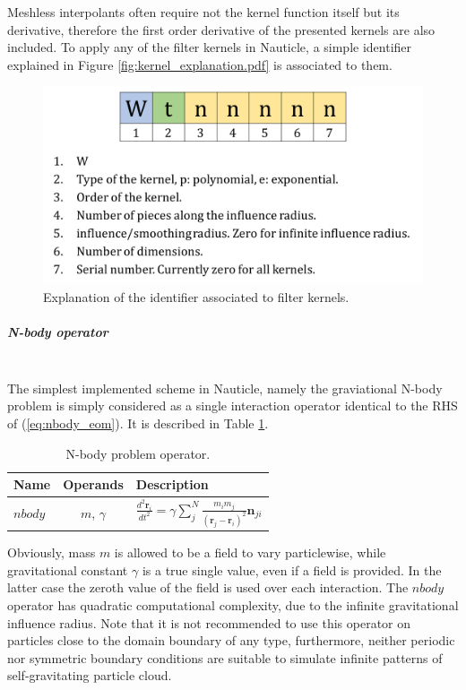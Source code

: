 \documentclass[a4paper,12pt,openany]{book}
\newcommand{\equref}[1]{(\ref{#1})}
\newcommand{\mysubparagraph}[1]{\subparagraph{#1}\mbox{}\\}
\theoremstyle{break}
\begin{document}
Meshless interpolants often require not the kernel function itself but its derivative, therefore the first order derivative of the presented kernels are also included. To apply any of the filter kernels in Nauticle, a simple identifier explained in Figure \ref{fig:kernel_explanation.pdf} is associated to them.
\begin{figure}[H]
  \includegraphics[scale=0.3]{kernel_explanation.pdf}
  \centering
  \caption{Explanation of the identifier associated to filter kernels.}
  \label{fig:kernel_explanation}
\end{figure}

\mysubparagraph{N-body operator}
The simplest implemented scheme in Nauticle, namely the graviational N-body problem is simply considered as a single interaction operator identical to the RHS of \equref{eq:nbody_eom}. It is described in Table \ref{tbl:nbody_op}.
\begin{table} [hbt!]
\begin{center}
\caption{N-body problem operator.}\label{tbl:nbody_op}
\begin{tabular}{ l c l }
\toprule[1.5pt]
\bf Name & \bf Operands & \bf Description \\ 
\midrule
$nbody$ & $m$, $\gamma$ & $\frac{d^2\textbf{r}_i}{dt^2}=\gamma\sum_j^N{\frac{m_im_j}{(\textbf{r}_j-\textbf{r}_i)^2}\textbf{n}_{ji}}$ \\ 
\bottomrule[1.25pt]
\end{tabular}
\end{center}
\end{table}
Obviously, mass $m$ is allowed to be a field to vary particlewise, while gravitational constant $\gamma$ is a true single value, even if a field is provided. In the latter case the zeroth value of the field is used over each interaction. The $nbody$ operator has quadratic computational complexity, due to the infinite gravitational influence radius. Note that it is not recommended to use this operator on particles close to the domain boundary of any type, furthermore, neither periodic nor symmetric boundary conditions are suitable to simulate infinite patterns of self-gravitating particle cloud.
\end{document}
